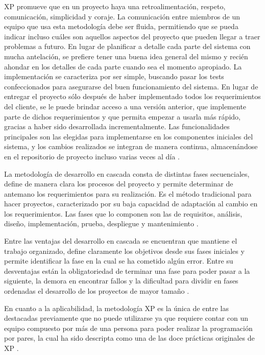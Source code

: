 \documentclass{article}
\begin{document}
XP promueve que en un proyecto haya una retroalimentación, respeto, comunicación, simplicidad y coraje. La comunicación entre miembros de un equipo que usa esta metodología debe ser fluida, permitiendo que se pueda indicar incluso cuáles son aquellos aspectos del proyecto que pueden llegar a traer problemas a futuro. En lugar de planificar a detalle cada parte del sistema con mucha antelación, se prefiere tener una buena idea general del mismo y recién ahondar en los detalles de cada parte cuando sea el momento apropiado. La implementación se caracteriza por ser simple, buscando pasar los tests confeccionados para asegurarse del buen funcionamiento del sistema. En lugar de entregar el proyecto sólo después de haber implementado todos los requerimientos del cliente, se le puede brindar acceso a una versión anterior, que implemente parte de dichos requerimientos y que permita empezar a usarla más rápido, gracias a haber sido desarrollada incrementalmente. Las funcionalidades principales son las elegidas para implementarse en los componentes iniciales del sistema, y los cambios realizados se integran de manera continua, almacenándose en el repositorio de proyecto incluso varias veces al día \parencite{agileProjectManagement}.

La metodología de desarrollo en cascada consta de distintas fases secuenciales, define de manera clara los procesos del proyecto y permite determinar de antemano los requerimientos para su realización. Es el método tradicional para hacer proyectos, caracterizado por su baja capacidad de adaptación al cambio en los requerimientos. Las fases que lo componen son las de requisitos, análisis, diseño, implementación, prueba, despliegue y mantenimiento \parencite{iepWaterfall}.

Entre las ventajas del desarrollo en cascada se encuentran que mantiene el trabajo organizado, define claramente los objetivos desde sus fases iniciales y permite identificar la fase en la cual se ha cometido algún error. Entre su desventajas están la obligatoriedad de terminar una fase para poder pasar a la siguiente, la demora en encontrar fallos y la dificultad para dividir en fases ordenadas el desarrollo de los proyectos de mayor tamaño \parencite{crehanaWaterfall}.

En cuanto a la aplicabilidad, la metodología XP es la única de entre las destacadas previamente que no puede utilizarse ya que requiere contar con un equipo compuesto por más de una persona para poder realizar la programación por pares, la cual ha sido descripta como una de las doce prácticas originales de XP \parencite{agileAlliance}.
\end{document}
